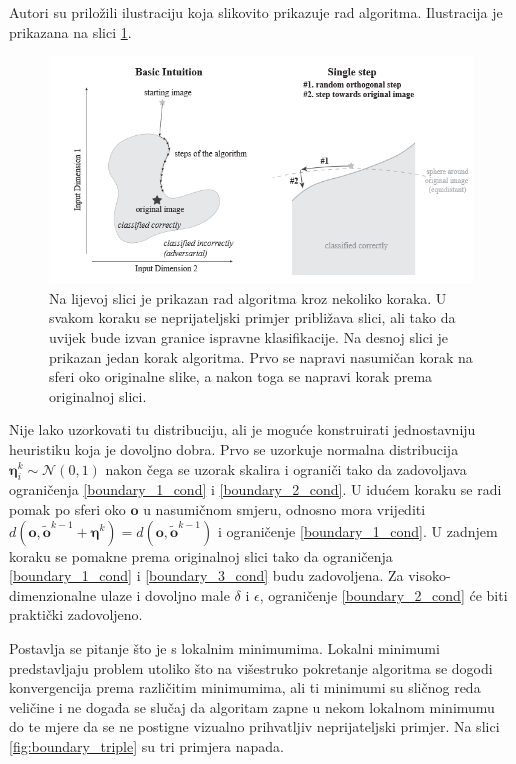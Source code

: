 \documentclass[utf8, diplomski]{fer}
\begin{document}
Autori su priložili ilustraciju koja slikovito prikazuje rad algoritma. Ilustracija je prikazana na slici \ref{fig:boundary_intuition}.


\begin{figure}[H]
\centering
\includegraphics[width=1.0\textwidth,keepaspectratio]{img/other/boundary_intuition.png}
\caption{Na lijevoj slici je prikazan rad algoritma kroz nekoliko koraka. U svakom koraku se neprijateljski primjer približava slici, ali tako da uvijek bude izvan granice ispravne klasifikacije. Na desnoj slici je prikazan jedan korak algoritma. Prvo se napravi nasumičan korak na sferi oko originalne slike, a nakon toga se napravi korak prema originalnoj slici.}
\label{fig:boundary_intuition}
\end{figure}

Nije lako uzorkovati tu distribuciju, ali je moguće konstruirati jednostavniju heuristiku koja je dovoljno dobra. Prvo se uzorkuje normalna distribucija $\boldsymbol{\eta}_{i}^{k} \sim \mathcal{N}(0, 1)$ nakon čega se uzorak skalira i ograniči tako da zadovoljava ograničenja \ref{boundary_1_cond} i \ref{boundary_2_cond}. U idućem koraku se radi pomak po sferi oko $\boldsymbol{o}$ u nasumičnom smjeru, odnosno mora vrijediti $d(\boldsymbol{o}, \boldsymbol{\tilde{o}}^{k-1} + \boldsymbol{\eta}^{k}) = d(\boldsymbol{o}, \boldsymbol{\tilde{o}}^{k-1})$ i ograničenje \ref{boundary_1_cond}. U zadnjem koraku se pomakne prema originalnoj slici tako da ograničenja \ref{boundary_1_cond} i \ref{boundary_3_cond} budu zadovoljena. Za visoko-dimenzionalne ulaze i dovoljno male $\delta$ i $\epsilon$, ograničenje \ref{boundary_2_cond} će biti praktički zadovoljeno. \par
Postavlja se pitanje što je s lokalnim minimumima. Lokalni minimumi predstavljaju problem utoliko što na višestruko pokretanje algoritma se dogodi konvergencija prema različitim minimumima, ali ti minimumi su sličnog reda veličine i ne događa se slučaj da algoritam zapne u nekom lokalnom minimumu do te mjere da se ne postigne vizualno prihvatljiv neprijateljski primjer. Na slici \ref{fig:boundary_triple} su tri primjera napada. 
\end{document}
